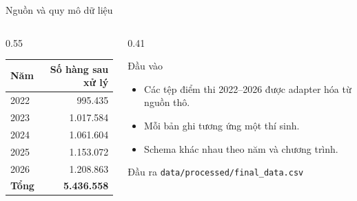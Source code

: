 \documentclass[aspectratio=169,11pt]{beamer}
\begin{document}
\begin{frame}{Nguồn và quy mô dữ liệu}
  \begin{columns}[T,onlytextwidth]
    \begin{column}{0.55\textwidth}
      \small
      \begin{tabular}{@{}lr@{}}
        \toprule
        \textbf{Năm} & \textbf{Số hàng sau xử lý} \\
        \midrule
        2022 & 995.435 \\
        2023 & 1.017.584 \\
        2024 & 1.061.604 \\
        2025 & 1.153.072 \\
        2026 & 1.208.863 \\
        \midrule
        \textbf{Tổng} & \textbf{5.436.558} \\
        \bottomrule
      \end{tabular}
    \end{column}
    \begin{column}{0.41\textwidth}
      \begin{block}{Đầu vào}
        \small
        \begin{itemize}
          \item Các tệp điểm thi 2022--2026 được adapter hóa từ nguồn thô.
          \item Mỗi bản ghi tương ứng một thí sinh.
          \item Schema khác nhau theo năm và chương trình.
        \end{itemize}
      \end{block}
      \begin{block}{Đầu ra}
        \small
        \texttt{data/processed/final\_data.csv}
      \end{block}
    \end{column}
  \end{columns}
\end{frame}
\end{document}
